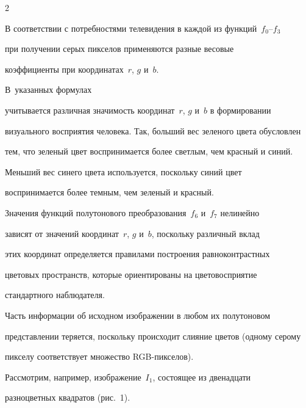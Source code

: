 \begin{multicols}{2}
\renewcommand{\figurename}{\protect\bf Рис.}

\renewcommand{\tablename}{\protect\bf Таблица}

\setcounter{figure}{2}

\setcounter{table}{1}











  В соответствии с потребностями телевидения в каждой из функций~$f_0$--$f_3$

  при получении серых пикселов применяются разные весовые

коэффициенты при координатах~$r$, $g$ и~$b$.

%

В~указанных формулах

учитывается различная значимость координат~$r$, $g$ и~$b$ в формировании

визуального восприятия человека. Так, больший вес зеленого цвета обусловлен

тем, что зеленый цвет воспринимается более светлым, чем красный и синий.

Меньший вес синего цвета используется, поскольку синий цвет

воспринимается более темным, чем зеленый и красный.



  Значения функций полутонового преобразо\-вания~$f_6$ и~$f_7$ нелинейно

зависят от значений ко\-ор\-динат~$r$, $g$ и~$b$, поскольку различный вклад

этих координат определяется правилами по\-стро\-ения равноконтраст\-ных

цветовых пространств, которые ориентированы на цветовосприятие

стандартного наблюдателя.



  Часть информации об исходном изображении в любом их полутоновом

представлении теряется, поскольку происходит слияние цветов (одному серому

пикселу соответствует множество RGB-пик\-селов).



  Рассмотрим, например, изображение~$I_1$, со\-сто\-ящее из двенадцати

разноцветных квадратов (рис.~1).




\end{multicols}
